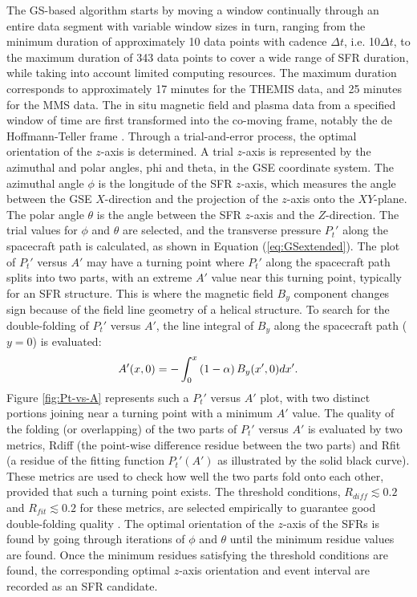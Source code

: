 The GS-based algorithm starts by moving a window continually through an entire data segment with variable window sizes in turn, ranging from the minimum duration of approximately 10 data points with cadence $\Delta t$, i.e. 10$\Delta t$, to the maximum duration of 343 data points to cover a wide range of SFR duration, while taking into account limited computing resources. The maximum duration corresponds to approximately 17 minutes for the THEMIS data, and 25 minutes for the MMS data. The in situ magnetic field and plasma data from a specified window of time are first transformed into the co-moving frame, notably the de Hoffmann-Teller frame \citep{deHoffman-Teller:1950}. Through a trial-and-error process, the optimal orientation of the $z$-axis is determined. A trial $z$-axis is represented by the azimuthal and polar angles, \gls{phi} and \gls{theta}, in the GSE coordinate system. The azimuthal angle $\phi$ is the longitude of the SFR $z$-axis, which measures the angle between the GSE $X$-direction and the projection of the $z$-axis onto the $XY$-plane. The polar angle $\theta$ is the angle between the SFR $z$-axis and the $Z$-direction. The trial values for $\phi$ and $\theta$ are selected, and the transverse pressure $P_t'$ along the spacecraft path is calculated, as shown in Equation (\ref{eq:GSextended}). The plot of $P_t'$ versus $A'$ may have a turning point where $P_t'$ along the spacecraft path splits into two parts, with an extreme $A'$ value near this turning point, typically for an SFR structure. This is where the magnetic field $B_y$ component changes sign because of the field line geometry of a helical structure. To search for the double-folding of $P_t'$ versus $A'$, the line integral of $B_y$ along the spacecraft path ($y=0$) is evaluated:
\begin{equation}
    A'(x,0)=-\int_0^x\left( 1-\alpha \right)B_y(x',0)dx'.
    \label{eq:By-integral}
\end{equation}
Figure \ref{fig:Pt-vs-A} represents such a $P_t'$ versus $A'$ plot, with two distinct portions joining near a turning point with a minimum $A'$ value. The quality of the folding (or overlapping) of the two parts of $P_t'$ versus $A'$ is evaluated by two metrics, \gls{Rdiff} (the point-wise difference residue between the two parts) and \gls{Rfit} (a residue of the fitting function $P_t'(A')$ as illustrated by the solid black curve). These metrics are used to check how well the two parts fold onto each other, provided that such a turning point exists. The threshold conditions, $R_{diff}\lesssim 0.2$ and $R_{fit}\lesssim 0.2$ for these metrics, are selected empirically to guarantee good double-folding quality \citep{Hu:2018}. The optimal orientation of the $z$-axis of the SFRs is found by going through iterations of $\phi$ and $\theta$ until the minimum residue values are found. Once the minimum residues satisfying the threshold conditions are found, the corresponding optimal $z$-axis orientation and event interval are recorded as an SFR candidate.

